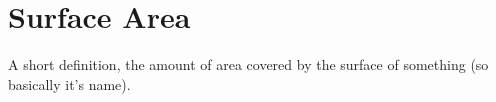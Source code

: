 \newpage

\section*{Surface Area}
A short definition, the amount of area covered by the surface of something (so basically it's name).
